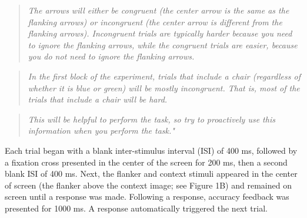 \documentclass[english,,man,floatsintext]{apa6}
\begin{document}
\begin{quote}
\emph{The arrows will either be congruent (the center arrow is the same as the flanking arrows) or incongruent (the center arrow is different from the flanking arrows). Incongruent trials are typically harder because you need to ignore the flanking arrows, while the congruent trials are easier, because you do not need to ignore the flanking arrows.}
\end{quote}

\begin{quote}
\emph{In the first block of the experiment, trials that include a chair (regardless of whether it is blue or green) will be mostly incongruent. That is, most of the trials that include a chair will be hard.}
\end{quote}

\begin{quote}
\emph{This will be helpful to perform the task, so try to proactively use this information when you perform the task."}
\end{quote}

Each trial began with a blank inter-stimulus interval (ISI) of 400 ms, followed by a fixation cross presented in the center of the screen for 200 ms, then a second blank ISI of 400 ms. Next, the flanker and context stimuli appeared in the center of screen (the flanker above the context image; see Figure 1B) and remained on screen until a response was made. Following a response, accuracy feedback was presented for 1000 ms. A response automatically triggered the next trial.
\end{document}
